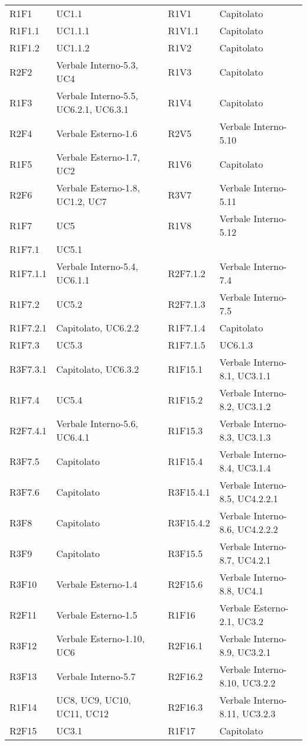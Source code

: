 \begin{center}
\begin{longtable}{C{2cm} | C{5cm} C{0.2cm} C{2cm} | C{5cm}}
R1F1 & UC1.1 &  & R1V1 & Capitolato \\
R1F1.1 & UC1.1.1 &  & R1V1.1 & Capitolato \\
R1F1.2 & UC1.1.2 &  & R1V2 & Capitolato  \\
R2F2 & Verbale Interno-5.3, UC4 &  & R1V3 & Capitolato  \\
R1F3 & Verbale Interno-5.5, UC6.2.1, UC6.3.1 &  & R1V4 & Capitolato\\
R2F4 & Verbale Esterno-1.6 &  & R2V5 & Verbale Interno-5.10  \\
R1F5 & Verbale Esterno-1.7, UC2 &  & R1V6 & Capitolato \\
R2F6 & Verbale Esterno-1.8, UC1.2, UC7 &  & R3V7 & Verbale Interno-5.11  \\
R1F7 & UC5 &  & R1V8 & Verbale Interno-5.12  \\
R1F7.1 & UC5.1 &  & & \\
R1F7.1.1 & Verbale Interno-5.4, UC6.1.1 &  & R2F7.1.2 & Verbale Interno-7.4 \\
R1F7.2 & UC5.2 &  & R2F7.1.3 & Verbale Interno-7.5 \\
R1F7.2.1 & Capitolato, UC6.2.2 &  & R1F7.1.4  & Capitolato \\
R1F7.3 & UC5.3 &  & R1F7.1.5 & UC6.1.3 \\
R3F7.3.1 & Capitolato, UC6.3.2 &  & R1F15.1  & Verbale Interno-8.1, UC3.1.1 \\
R1F7.4 & UC5.4 &  & R1F15.2 & Verbale Interno-8.2, UC3.1.2 \\
R2F7.4.1 & Verbale Interno-5.6, UC6.4.1 &  & R1F15.3 & Verbale Interno-8.3, UC3.1.3 \\
R3F7.5 & Capitolato &  & R1F15.4 & Verbale Interno-8.4, UC3.1.4 \\
R3F7.6 & Capitolato &  & R3F15.4.1 & Verbale Interno-8.5, UC4.2.2.1 \\
R3F8 & Capitolato &  & R3F15.4.2 & Verbale Interno-8.6, UC4.2.2.2 \\
R3F9 & Capitolato &  & R3F15.5 & Verbale Interno-8.7, UC4.2.1 \\
R3F10 & Verbale Esterno-1.4 &  & R2F15.6 & Verbale Interno-8.8, UC4.1 \\
R2F11 & Verbale Esterno-1.5 &  & R1F16 & Verbale Esterno-2.1, UC3.2 \\
R3F12 & Verbale Esterno-1.10, UC6 &  & R2F16.1 & Verbale Interno-8.9, UC3.2.1 \\
R3F13 & Verbale Interno-5.7 &  & R2F16.2 & Verbale Interno-8.10, UC3.2.2 \\
R1F14 & UC8, UC9, UC10, UC11, UC12 &  & R2F16.3 & Verbale Interno-8.11, UC3.2.3 \\
R2F15 & UC3.1 &  & R1F17 & Capitolato \\


\end{longtable}
\end{center}
